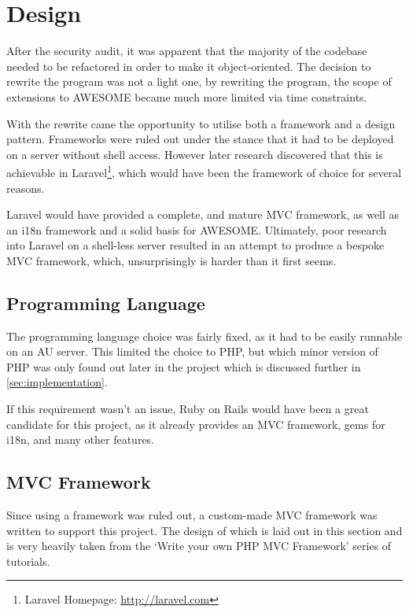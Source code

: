 \chapter{Design}
	
	After the security audit, it was apparent that the majority of the codebase needed to be refactored in order to make it object-oriented.
	The decision to rewrite the program was not a light one, by rewriting the program, the scope of extensions to \ac{AWESOME} became much more limited via time constraints.
	
	With the rewrite came the opportunity to utilise both a framework and a design pattern.
	Frameworks were ruled out under the stance that it had to be deployed on a server without shell access.
	However later research discovered that this is achievable in Laravel\footnote{Laravel Homepage: \url{http://laravel.com}}, which would have been the framework of choice for several reasons.
	
	Laravel would have provided a complete, and mature \ac{MVC} framework, as well as an \ac{i18n} framework and a solid basis for \ac{AWESOME}.
	Ultimately, poor research into Laravel on a shell-less server resulted in an attempt to produce a bespoke \ac{MVC} framework, which, unsurprisingly is harder than it first seems.
	
	\section{Programming Language}
	
	The programming language choice was fairly fixed, as it had to be easily runnable on an \ac{AU} server.
	This limited the choice to PHP, but which minor version of PHP was only found out later in the project which is discussed further in \autoref{sec:implementation}.
	
	If this requirement wasn't an issue, Ruby on Rails would have been a great candidate for this project, as it already provides an \ac{MVC} framework, gems for \ac{i18n}, and many other features.
	
	\newpage
	
	\section{\acl{MVC} Framework}
	
	Since using a framework was ruled out, a custom-made \ac{MVC} framework was written to support this project.
	The design of which is laid out in this section and is very heavily taken from the `Write your own PHP MVC Framework' series of tutorials\cite{php-mvc-tutorial}.
	
